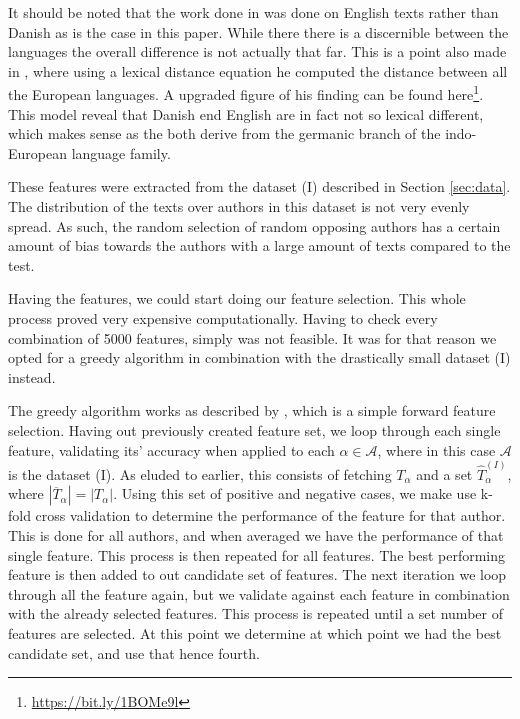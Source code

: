 It should be noted that the work done in \citet{US} was done on English
texts rather than Danish as is the case in this paper. While there there is
a discernible between the languages the overall difference is not actually
that far. This is a point also made in \citet{konstantin:2000}, where
using a lexical distance equation he computed the distance between all
the European languages. A upgraded figure of his finding can be found
here\footnote{\url{https://bit.ly/1BOMe9l}}. This model reveal
that Danish end English are in fact not so lexical different, which makes sense
as the both derive from the germanic branch of the indo-European language
family.

These features were extracted from the dataset (I) described in Section
\ref{sec:data}. The distribution of the texts over authors in this dataset is
not very evenly spread. As such, the random selection of random opposing authors
has a certain amount of bias towards the authors with a large amount of texts
compared to the test.

Having the features, we could start doing our feature selection. This whole
process proved very expensive computationally. Having to check every combination
of 5000 features, simply was not feasible. It was for that reason we opted for a
greedy algorithm in combination with the drastically small dataset (I) instead.

The greedy algorithm works as described by \citet{kanDeng}, which is a simple
forward feature selection. Having out previously created feature set, we loop
through each single feature, validating its' accuracy when applied to each
$\alpha \in \mathcal{A}$, where in this case $\mathcal{A}$ is the dataset
(I). As eluded to earlier, this consists of fetching $T_{\alpha}$ and a set
$\hat{T}^{(I)}_{\alpha}$, where $|\overline{T}_\alpha| = |T_\alpha|$. Using
this set of positive and negative cases, we make use k-fold cross validation
to determine the performance of the feature for that author. This is done for
all authors, and when averaged we have the performance of that single feature.
This process is then repeated for all features. The best performing feature is
then added to out candidate set of features. The next iteration we loop through
all the feature again, but we validate against each feature in combination with
the already selected features. This process is repeated until a set number of
features are selected. At this point we determine at which point we had the best
candidate set, and use that hence fourth.

